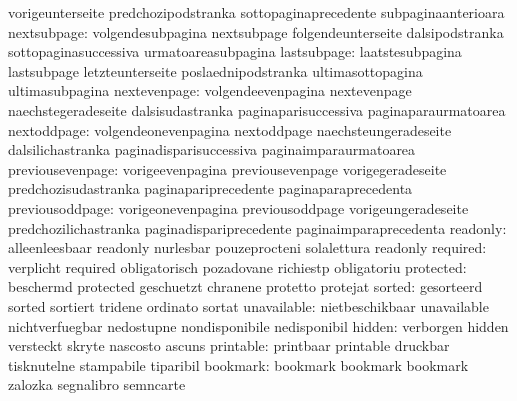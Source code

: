                            vorigeunterseite          predchozipodstranka
                           sottopaginaprecedente     subpaginaanterioara
              nextsubpage: volgendesubpagina         nextsubpage
                           folgendeunterseite        dalsipodstranka
                           sottopaginasuccessiva     urmatoareasubpagina
              lastsubpage: laatstesubpagina          lastsubpage
                           letzteunterseite          poslaednipodstranka
                           ultimasottopagina         ultimasubpagina
             nextevenpage: volgendeevenpagina        nextevenpage
                           naechstegeradeseite       dalsisudastranka
                           paginaparisuccessiva      paginaparaurmatoarea
              nextoddpage: volgendeonevenpagina      nextoddpage
                           naechsteungeradeseite     dalsilichastranka
                           paginadisparisuccessiva   paginaimparaurmatoarea
         previousevenpage: vorigeevenpagina          previousevenpage
                           vorigegeradeseite         predchozisudastranka
                           paginapariprecedente      paginaparaprecedenta
          previousoddpage: vorigeonevenpagina        previousoddpage
                           vorigeungeradeseite       predchozilichastranka
                           paginadispariprecedente   paginaimparaprecedenta
                 readonly: alleenleesbaar            readonly
                           nurlesbar                 pouzeprocteni
                           solalettura               readonly
                 required: verplicht                 required
                           obligatorisch             pozadovane
                           richiestp                 obligatoriu
                protected: beschermd                 protected
                           geschuetzt                chranene
                           protetto                  protejat
                   sorted: gesorteerd                sorted
                           sortiert                  tridene
                           ordinato                  sortat
              unavailable: nietbeschikbaar           unavailable
                           nichtverfuegbar           nedostupne
                           nondisponibile            nedisponibil
                   hidden: verborgen                 hidden
                           versteckt                 skryte
                           nascosto                  ascuns
                printable: printbaar                 printable
                           druckbar                  tisknutelne
                           stampabile                tiparibil
                 bookmark: bookmark                  bookmark
                           bookmark                  zalozka
                           segnalibro                semncarte

